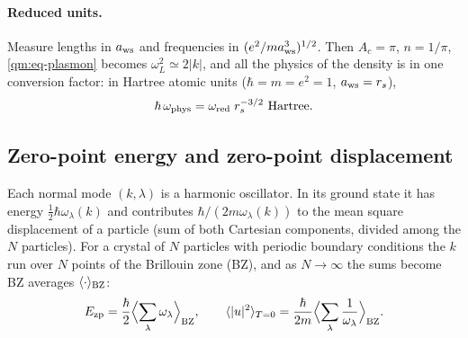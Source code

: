 \paragraph{Reduced units.} Measure lengths in $a_{\rm ws}$ and frequencies in $(e^2/ma_{\rm ws}^3)^{1/2}$. Then
$A_c=\pi$, $n=1/\pi$, \eqref{qm:eq-plasmon} becomes $\omega_L^2\simeq2|k|$, and all the physics of the density is in
one conversion factor: in Hartree atomic units ($\hbar=m=e^2=1$, $a_{\rm ws}=r_s$),
\begin{equation}\label{qm:eq-omega-units}
\hbar\,\omega_{\rm phys}=\omega_{\rm red}\;r_s^{-3/2}\ \text{Hartree}.
\end{equation}

\subsection{Zero-point energy and zero-point displacement}\label{qm:sec-zp}

Each normal mode $(k,\lambda)$ is a harmonic oscillator. In its ground state it has energy $\frac12\hbar\omega_\lambda(k)$
and contributes $\hbar/(2m\omega_\lambda(k))$ to the mean square displacement of a particle (sum of both Cartesian
components, divided among the $N$ particles). For a crystal of $N$ particles with periodic boundary conditions the $k$
run over $N$ points of the Brillouin zone (BZ), and as $N\to\infty$ the sums become BZ averages
$\langle\cdot\rangle_{\rm BZ}$:
\begin{equation}\label{qm:eq-zp}
E_{\rm zp}=\frac{\hbar}{2}\Bigl\langle\sum_\lambda\omega_\lambda\Bigr\rangle_{\rm BZ},\qquad
\langle|u|^2\rangle_{T=0}=\frac{\hbar}{2m}\Bigl\langle\sum_\lambda\frac1{\omega_\lambda}\Bigr\rangle_{\rm BZ}.
\end{equation}


